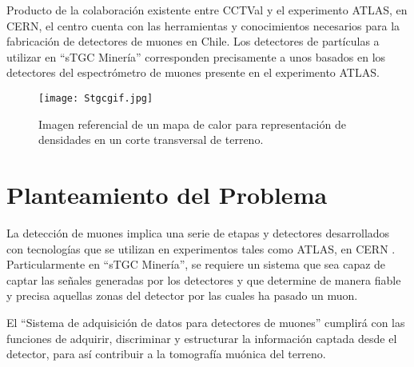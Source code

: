 	
	Producto de la colaboración existente entre CCTVal y el experimento ATLAS, en CERN, el centro cuenta con las herramientas y conocimientos necesarios para la fabricación de detectores de muones en Chile. Los detectores de partículas a utilizar en ``sTGC Minería'' corresponden precisamente a unos basados en los detectores del espectrómetro de muones presente en el experimento ATLAS.
	
	\begin{figure}[h]
		\centering
		\texttt{[image: Stgcgif.jpg]}
		\caption{Imagen referencial de un mapa de calor para representación de densidades en un corte transversal de terreno.}
		\label{img:muongrafia}
	\end{figure}
	

\section{Planteamiento del Problema}
\label{sec:planteamiento}
	La detección de muones implica una serie de etapas y detectores desarrollados con tecnologías que se utilizan en experimentos tales como ATLAS, en CERN . Particularmente en ``sTGC Minería'', se requiere un sistema que sea capaz de captar las señales generadas por los detectores y que determine de manera fiable y precisa  aquellas zonas del detector por las cuales ha pasado un muon.
	
	El ``Sistema de adquisición de datos para detectores de muones'' cumplirá con las funciones de adquirir, discriminar y estructurar la información captada desde el detector, para así contribuir a la tomografía muónica del terreno.
	
